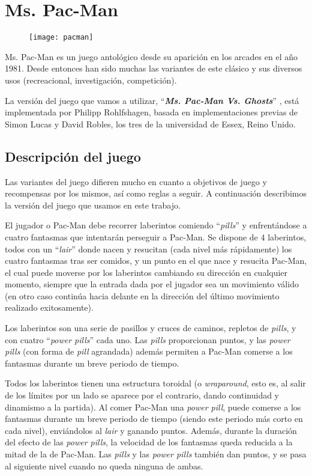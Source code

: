 \chapter{Ms. Pac-Man} \label{cap:ms-pacman}
\begin{figure}[H]
\centering
\texttt{[image: pacman]}
\end{figure}

Ms. Pac-Man es un juego antológico desde su aparición en los arcades en el año 1981. Desde entonces han sido muchas las variantes de este clásico y sus diversos usos (recreacional, investigación, competición).
 
La versión del juego que vamos a utilizar, ``\textbf{\textit{Ms. Pac-Man Vs. Ghosts}}'' \cite{pacmanvsghostsTournamentPage} \cite{pacmanvsghostsGit}, está implementada por Philipp Rohlfshagen, basada en implementaciones previas de Simon Lucas y David Robles, los tres de la universidad de Essex, Reino Unido.


\section{Descripción del juego}
Las variantes del juego difieren mucho en cuanto a objetivos de juego y recompensas por los mismos, así como reglas a seguir. A continuación describimos la versión del juego que usamos en este trabajo.

El jugador o Pac-Man debe recorrer laberintos comiendo ``\textit{pills}'' y enfrentándose a cuatro fantasmas que intentarán perseguir a Pac-Man. Se dispone de 4 laberintos, todos con un ``\textit{lair}'' donde nacen y resucitan (cada nivel más rápidamente) los cuatro fantasmas tras ser comidos, y un punto en el que nace y resucita Pac-Man, el cual puede moverse por los laberintos cambiando su dirección en cualquier momento, siempre que la entrada dada por el jugador sea un movimiento válido (en otro caso continúa hacia delante en la dirección del último movimiento realizado exitosamente).
 
\blankline

Los laberintos son una serie de pasillos y cruces de caminos, repletos de \textit{pills}, y con cuatro ``\textit{power pills}'' cada uno. Las \textit{pills} proporcionan puntos, y las \textit{power pills} (con forma de \textit{pill} agrandada) además permiten a Pac-Man comerse a los fantasmas durante un breve periodo de tiempo.

Todos los laberintos tienen una estructura toroidal (o \textit{wraparound}, esto es, al salir de los límites por un lado se aparece por el contrario, dando continuidad y dinamismo a la partida). Al comer Pac-Man una \textit{power pill}, puede comerse a los fantasmas durante un breve periodo de tiempo (siendo este periodo más corto en cada nivel), enviándolos al \textit{lair} y ganando puntos. Además, durante la duración del efecto de las \textit{power pills}, la velocidad de los fantasmas queda reducida a la mitad de la de Pac-Man. Las \textit{pills} y las \textit{power pills} también dan puntos, y se pasa al siguiente nivel cuando no queda ninguna de ambas.
 

